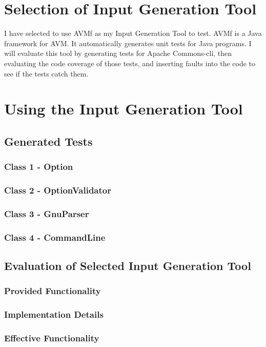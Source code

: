 \documentclass[letterpaper,10pt]{article}
\begin{document}
\section{Selection of Input Generation Tool}
I have selected to use AVMf as my Input Generation Tool to test. AVMf is a Java framework for AVM.
 It automatically generates unit tests for Java programs. I will evaluate this tool by 
generating tests for Apache Commons-cli, then evaluating the code coverage of those tests, and 
inserting faults into the code to see if the tests catch them.

\section{Using the Input Generation Tool}
	\subsection{Generated Tests}
		\subsubsection{Class 1 - Option}
		

		\subsubsection{Class 2 - OptionValidator}
		

		\subsubsection{Class 3 - GnuParser}
		

		\subsubsection{Class 4 - CommandLine}
		
	\subsection{Evaluation of Selected Input Generation Tool}
		\subsubsection{Provided Functionality}
		\subsubsection{Implementation Details}
		\subsubsection{Effective Functionality}
\end{document}
